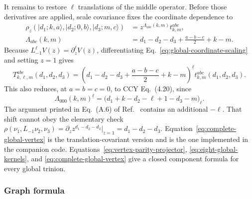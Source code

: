 \documentclass[11pt]{article}
\begin{document}
It remains to restore \(\ell\) translations of the middle operator.
Before those derivatives are applied, scale covariance fixes the coordinate
dependence to
\begin{equation}
 \begin{aligned}
 \rho_z\!\left(
 |d_1;k,a\rangle,|d_2;0,b\rangle,|d_3;m,c\rangle
 \right)
 &=z^{\Lambda_{abc}(k,m)}t_{k,m}^{abc},\\
 \Lambda_{abc}(k,m)
 &=d_1-d_2-d_3+\frac{a-b-c}{2}+k-m.
 \end{aligned}
 \label{eq:global-coordinate-scaling}
\end{equation}
Because \(L_{-1}^{\ell}V(z)=\partial_z^{\ell}V(z)\), differentiating
Eq.~\eqref{eq:global-coordinate-scaling} and setting \(z=1\) gives
\begin{equation}
\boxed{
 T_{k,\ell,m}^{abc}(d_1,d_2,d_3)
 =\left(
 d_1-d_2-d_3+\frac{a-b-c}{2}+k-m
 \right)^{\underline\ell}
 t_{k,m}^{abc}(d_1,d_2,d_3).}
 \label{eq:complete-global-vertex}
\end{equation}
This also reduces, at \(a=b=c=0\), to CCY Eq.~(4.20), since
\begin{equation}
 \Lambda_{000}(k,m)^{\underline\ell}
 =\bigl(d_1+k-d_2-\ell+1-d_3-m\bigr)_{\ell}.
 \label{eq:ccy-middle-chain-limit}
\end{equation}
The argument printed in Eq.~(A.6) of
Ref.~\cite{BelavinGeiko2018CRecursion} contains an additional
\(-\ell\).  That shift cannot obey the elementary check
\(\rho(\nu_1,L_{-1}\nu_2,\nu_3)
=\partial_z z^{d_1-d_2-d_3}|_{z=1}=d_1-d_2-d_3\).
Equation~\eqref{eq:complete-global-vertex} is the translation-covariant
version and is the one implemented in the companion code.
Equations~\eqref{eq:vertex-parity-projector},
\eqref{eq:eight-global-kernels}, and
\eqref{eq:complete-global-vertex} give a closed component formula for every
global trinion.

\subsubsection{Graph formula}
\end{document}
